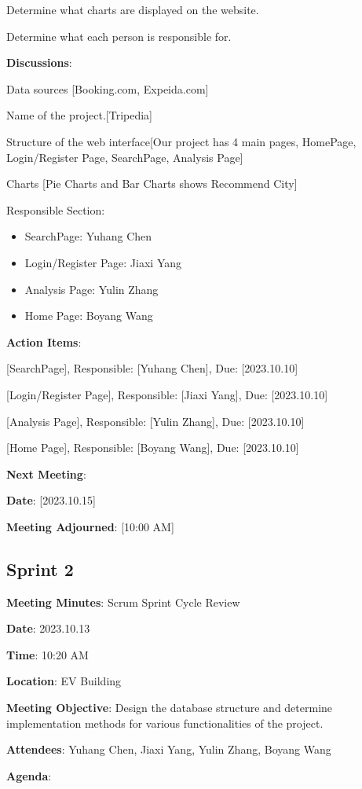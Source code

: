 \documentclass[conference]{IEEEtran}
\begin{document}
Determine what charts are displayed on the website.

Determine what each person is responsible for.

\textbf{Discussions}:

Data sources [Booking.com, Expeida.com]

Name of the project.[Tripedia]

Structure of the web interface[Our project has 4 main pages, HomePage, Login/Register Page, SearchPage, Analysis Page]

Charts [Pie Charts and Bar Charts shows Recommend City]

Responsible Section:
\begin{itemize}
\item SearchPage: Yuhang Chen
\item Login/Register Page: Jiaxi Yang
\item Analysis Page: Yulin Zhang
\item Home Page: Boyang Wang
\end{itemize}
\textbf{Action Items}:

[SearchPage], Responsible: [Yuhang Chen], Due: [2023.10.10]

[Login/Register Page], Responsible: [Jiaxi Yang], Due: [2023.10.10]

[Analysis Page], Responsible: [Yulin Zhang], Due: [2023.10.10]

[Home Page], Responsible: [Boyang Wang], Due: [2023.10.10]

\textbf{Next Meeting}:

\textbf{Date}: [2023.10.15]

\textbf{Meeting Adjourned}: [10:00 AM]

\subsection*{Sprint 2}

\textbf{Meeting Minutes}: Scrum Sprint Cycle Review

\textbf{Date}: 2023.10.13

\textbf{Time}: 10:20 AM

\textbf{Location}: EV Building

\textbf{Meeting Objective}: Design the database structure and determine implementation methods for various functionalities of the project.

\textbf{Attendees}: Yuhang Chen, Jiaxi Yang, Yulin Zhang, Boyang Wang

\textbf{Agenda}:
\end{document}
